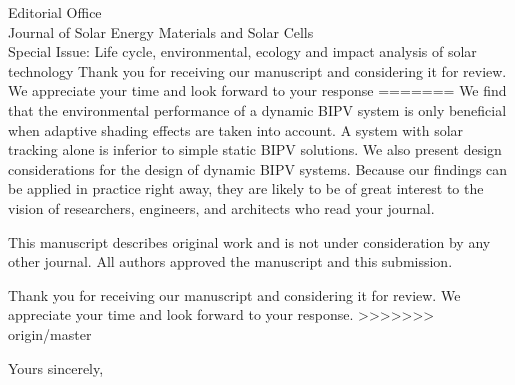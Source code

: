 \documentclass[a4paper,12pt]{letter}
\begin{document}
\begin{letter}{Editorial Office \\ Journal of Solar Energy Materials and Solar Cells\\ Special Issue: Life cycle, environmental, ecology and impact analysis of solar technology}
	Thank you for receiving our manuscript and considering it for review. We appreciate your time and look forward to your response
=======
	We find that the environmental performance of a dynamic BIPV system is only beneficial when adaptive shading effects are taken into account. A system with solar tracking alone is inferior to simple static BIPV solutions. We also present design considerations for the design of dynamic BIPV systems.
	Because our findings can be applied in practice right away, they are likely to be of great interest to the vision of researchers, engineers, and architects who read your journal. 

	This manuscript describes original work and is not under consideration by any other journal. All authors approved the manuscript and this submission.


	Thank you for receiving our manuscript and considering it for review. We appreciate your time and look forward to your response.
>>>>>>> origin/master

	\signature{Prageeth Jayathissa}
	\closing{Yours sincerely,}
\end{letter}

	
\end{document}

